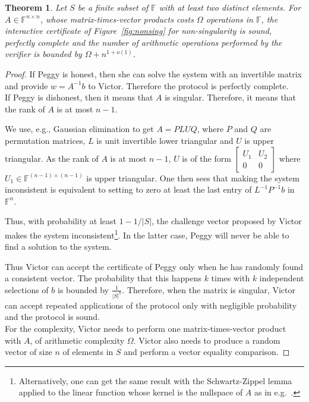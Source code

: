 \documentclass{article}
\newtheorem{theorem}{Theorem}
\newcommand{\F}{\ensuremath{\mathbb F}}
\newcommand{\card}[1]{\ensuremath{\left|#1\right|}\xspace}
\begin{document}
\begin{theorem}\label{thm:nonsing}
  Let $S$ be a finite subset of $\F$ with at least two distinct elements.
  For $A\in\F^{n\times n}$, whose matrix-times-vector products costs $\Omega$
  operations in $\F$, the interactive certificate of Figure~\ref{fig:nonsing}
  for non-singularity is sound, perfectly complete and the number of arithmetic
  operations performed by the verifier is bounded by $\Omega+n^{1+o(1)}$.
   
   
\end{theorem}
\begin{proof}
  If Peggy is honest, then she can solve the system with an
  invertible matrix and provide $w=A^{-1}b$ to Victor. Therefore the protocol is
  perfectly complete.\\  
   
  If Peggy is dishonest, then it means that $A$ is singular. 
  Therefore, it means that the rank of $A$ is at most $n-1$.
   
  We use, e.g., Gaussian elimination to get $A=PLUQ$, 
  where $P$ and $Q$ are permutation matrices, $L$ is unit invertible lower
  triangular and $U$ is upper triangular. As the rank of $A$ is at most $n-1$,
  $U$ is of the form
  $\left[\begin{smallmatrix}U_1&U_2\\0&0\end{smallmatrix}\right]$ where
  $U_1\in\F^{(n-1)\times (n-1)}$ is upper triangular.
  One then sees
  that making the system inconsistent is equivalent to setting to
  zero at least the last entry of $L^{-1}P^{-1}b$ in $\F^n$.
   
   
  Thus, with probability at least $1-1/\card{S}$, the challenge vector
  proposed by Victor makes the system inconsistent\footnote{Alternatively, one
    can get the same result with the Schwartz-Zippel lemma applied to the linear
    function whose kernel is the nullspace of $A$ as in
    e.g.~\cite[Theorem~2.2]{Giesbrecht:1998:CIS}.}. 
  In the latter case, Peggy will never be able to find a solution to the
  system. 

  Thus Victor can accept the certificate of Peggy only when he
  has randomly found a consistent vector. 
  The probability that this happens $k$ times with $k$ independent
  selections of $b$ is bounded by $\frac{1}{\card{S}^k}$.
  Therefore, when the matrix is singular, Victor can accept repeated
  applications of the protocol only with negligible probability and the
  protocol is sound.\\

  For the complexity, Victor needs to perform one matrix-times-vector product
  with $A$, of arithmetic complexity $\Omega$. 
  Victor also needs to produce a random vector of size $n$ of elements
  in $S$ and perform a vector equality comparison.
   
   
\end{proof}
\end{document}
